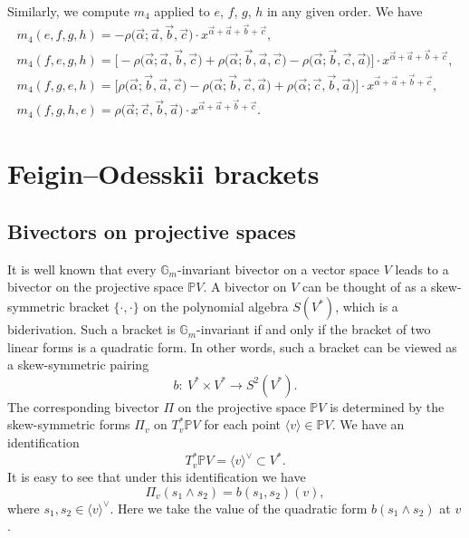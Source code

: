 \documentclass[10pt,a4paper]{amsart}
\numberwithin{equation}{section}
\newcommand{\we}{\wedge}
\renewcommand{\P}{{\mathbb P}}
\newcommand{\sub}{\subset}
\renewcommand{\a}{\alpha}
\newcommand{\G}{{\mathbb G}}
\newcommand{\lan}{\langle}
\newcommand{\ran}{\rangle}
\begin{document}
Similarly, we compute $m_4$ applied to $e$, $f$, $g$, $h$ in any given order.
We have
\begin{gather*}
m_4(e,f,g,h)=
-\rho\big(\vec{\a};\vec{a},\vec{b},\vec{c}\big)\cdot x^{\vec{\a}+\vec{a}+\vec{b}+\vec{c}},\\
m_4(f,e,g,h)=\big[-\rho\big(\vec{\a};\vec{a},\vec{b},\vec{c}\big)+\rho\big(\vec{\a};\vec{b},\vec{a},\vec{c}\big)-
\rho\big(\vec{\a};\vec{b},\vec{c},\vec{a}\big)\big]\cdot x^{\vec{\a}+\vec{a}+\vec{b}+\vec{c}},\\
m_4(f,g,e,h)=
\big[\rho\big(\vec{\a};\vec{b},\vec{a},\vec{c}\big)-
\rho\big(\vec{\a};\vec{b},\vec{c},\vec{a}\big)+\rho\big(\vec{\a};\vec{c},\vec{b},\vec{a}\big)\big]\cdot x^{\vec{\a}+\vec{a}+\vec{b}+\vec{c}},\\
m_4(f,g,h,e)=
\rho\big(\vec{\a};\vec{c},\vec{b},\vec{a}\big)\cdot x^{\vec{\a}+\vec{a}+\vec{b}+\vec{c}}.
\end{gather*}

\section{Feigin--Odesskii brackets}

\subsection{Bivectors on projective spaces}

It is well known that every $\G_m$-invariant bivector on a vector space $V$ leads to a bivector on the projective space $\P V$.
A bivector on $V$ can be thought of as a skew-symmetric bracket $\{\cdot,\cdot\}$ on the polynomial algebra $S(V^*)$,
which is a biderivation. Such a bracket is $\G_m$-invariant if and only if the bracket of two linear forms is a quadratic form.
In other words, such a bracket can be viewed as a skew-symmetric pairing
\[
b\colon \ V^*\times V^*\to S^2(V^*).
\]
The corresponding bivector $\Pi$ on the projective space $\P V$ is determined by the skew-symmetric forms
$\Pi_v$ on $T_v^* \P V$ for each point $\lan v\ran \in \P V$. We have an identification
\[
T_v^* \P V=\lan v\ran^\vee \sub V^*.
\]
It is easy to see that under this identification we have
\begin{equation}\label{Pi-b-formula}
\Pi_v(s_1\we s_2)=b(s_1,s_2)(v),
\end{equation}
where $s_1,s_2\in \lan v\ran^\vee$. Here we take the value of the quadratic form $b(s_1\we s_2)$ at $v$.
\end{document}
